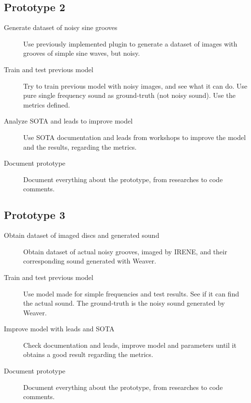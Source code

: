\documentclass[12pt, twoside]{article}
\begin{document}
\subsection{Prototype 2}
\begin{description}
	\item[Generate dataset of noisy sine grooves] Use previously implemented plugin to generate a dataset of images with grooves of simple sine waves, but noisy.
	\item[Train and test previous model] Try to train previous model with noisy images, and see what it can do. Use pure single frequency sound as ground-truth (not noisy sound). Use the metrics defined.
	\item[Analyze SOTA and leads to improve model] Use SOTA documentation and leads from workshops to improve the model and the results, regarding the metrics.
	\item[Document prototype] Document everything about the prototype, from researches to code comments.
\end{description}
\subsection{Prototype 3}
\begin{description}
	\item[Obtain dataset of imaged discs and generated sound] Obtain dataset of actual noisy grooves, imaged by IRENE, and their corresponding sound generated with Weaver.
	\item[Train and test previous model] Use model made for simple frequencies and test results. See if it can find the actual sound. The ground-truth is the noisy sound generated by Weaver.
	\item[Improve model with leads and SOTA] Check documentation and leads, improve model and parameters until it obtains a good result regarding the metrics.
	\item[Document prototype] Document everything about the prototype, from researches to code comments. 
\end{description}
\end{document}
